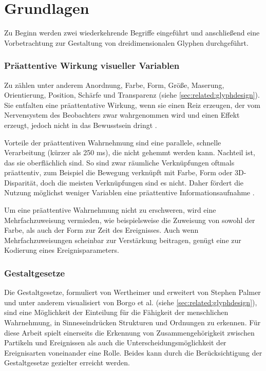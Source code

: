 \section{Grundlagen}

Zu Beginn werden zwei wiederkehrende Begriffe eingeführt und anschließend eine Vorbetrachtung zur Gestaltung von dreidimensionalen Glyphen durchgeführt.

\subsubsection*{Präattentive Wirkung visueller Variablen}\label{sec:related-praattentiveWirkung}
Zu  zählen unter anderem Anordnung, Farbe, Form, Größe, Maserung, Orientierung, Position, Schärfe und Transparenz (siehe \autoref{sec:related:glyphdesign}). Sie entfalten eine präattentative Wirkung, wenn sie einen Reiz erzeugen, der vom Nervensystem des Beobachters zwar wahrgenommen wird und einen Effekt erzeugt, jedoch nicht in das Bewusstsein dringt \cite{funke2006kognition}.

Vorteile der präattentiven Wahrnehmung sind eine parallele, schnelle Verarbeitung (kürzer als 250 \gls{ms}), die nicht gehemmt werden kann. Nachteil ist, das sie oberflächlich sind. So sind zwar räumliche Verknüpfungen oftmals präattentiv, zum Beispiel die Bewegung verknüpft mit Farbe, Form oder 3D-Disparität, doch die meisten Verknüpfungen sind es nicht. Daher fördert die Nutzung möglichst weniger Variablen eine präattentive Informationsaufnahme \cite{healey2012attention}.

Um eine präattentive Wahrnehmung nicht zu erschweren, wird eine Mehrfachzuweisung vermieden, wie beispielsweise die Zuweisung von sowohl der Farbe, als auch der Form zur Zeit des Ereignisses. Auch wenn Mehrfachzuweisungen scheinbar zur Verstärkung beitragen, genügt eine  zur Kodierung eines Ereignisparameters.

\subsubsection{Gestaltgesetze}\label{sec:grundlagen:gestaltgesetze}
Die Gestaltgesetze, formuliert von Wertheimer und erweitert von Stephen Palmer und unter anderem visualisiert von Borgo et al. (siehe \autoref{sec:related:glyphdesign}), sind eine Möglichkeit der Einteilung für die Fähigkeit der menschlichen Wahrnehmung, in Sinneseindrücken Strukturen und Ordnungen zu erkennen. Für diese Arbeit spielt einerseits die Erkennung von Zusammengehörigkeit zwischen Partikeln und Ereignissen als auch die Unterscheidungsmöglichkeit der Ereignisarten voneinander eine Rolle. Beides kann durch die Berücksichtigung der Gestaltgesetze gezielter erreicht werden.

